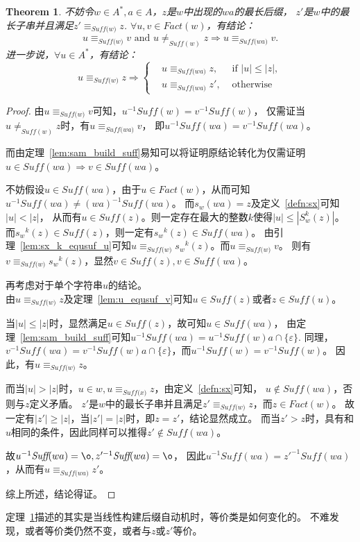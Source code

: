\documentclass[UTF8]{ctexart}
\newtheorem{thm}{Theorem}[subsection]
\theoremstyle{definition}
\theoremstyle{remark}
\numberwithin{equation}{subsection}
\newcommand{\equsuf}[1][x]{\equiv_{\textit{Suff(#1)}}}
\newcommand{\Suff}{\textit{Suff}}
\begin{document}
	\begin{thm}
	\label{thm:sam_ec}
		不妨令$w \in A^*, a \in A$，$z$是$w$中出现的$wa$的最长后缀，
		$z'$是$w$中的最长子串并且满足$z' \equsuf[w] z$.
		$\forall u,v \in Fact(w)$，有结论：
		\[
			u \equsuf[w] v \text{ and } u \neq_{\Suff(w)} z \Longrightarrow u \equsuf[wa] v.
		\]
		进一步说，$\forall u \in A^*$，有结论：
		\[
			u \equsuf[w] z \Longrightarrow
			\left\{
				\begin{aligned}
					&u \equsuf[wa] z,	&\text{ if } |u| \le |z|,	\\
					&u \equsuf[wa] z',	&\text{ otherwise }
				\end{aligned}
			\right .
		\]
	\end{thm}
	\begin{proof}
		由$u \equsuf[w] v$可知，$u^{-1} \Suff(w) = v^{-1} \Suff(w)$，
		仅需证当$u \neq_{\Suff(w)} z$时，有$u \equsuf[wa] v$，
		即$u^{-1} \Suff(wa) = v^{-1} \Suff(wa)$。
		
		而由定理~\ref{lem:sam_build_suff}易知可以将证明原结论转化为仅需证明
		$u \in \Suff(wa) \Longrightarrow v \in \Suff(wa)$。
		
		不妨假设$u \in \Suff(wa)$，由于$u \in Fact(w)$，从而可知$u^{-1} \Suff(wa) \neq (wa)^{-1} \Suff(wa)$。
		而$s_{w}(wa) = z$及定义~\ref{defn:sx}可知$|u| < |z|$，
		从而有$u \in \Suff(z)$。则一定存在最大的整数$k$使得$|u| \le |S_w^k(z)|$。
		而${s_w}^k(z) \in \Suff(z)$，则一定有${s_w}^k(z) \in \Suff(wa)$。
		由引理~\ref{lem:sx_k_equsuf_u}可知$u \equsuf[w] {s_w}^k(z)$。而$u \equsuf[w] v$。
		则有$v \equsuf[w] {s_w}^k(z)$，显然$v \in \Suff(z), v \in \Suff(wa)$。
		
		再考虑对于单个字符串$u$的结论。\\
		由$u \equsuf[w] z$及定理~\ref{lem:u_equsuf_v}可知$u \in \Suff(z)$或者$z \in \Suff(u)$。
		
		当$|u| \le |z|$时，显然满足$u \in \Suff(z)$，故可知$u \in \Suff(wa)$，
		由定理~\ref{lem:sam_build_suff}可知$u^{-1} \Suff(wa) = u^{-1} \Suff(w)a \cap \{ \varepsilon \}$.
		同理，$v^{-1} \Suff(wa) = v^{-1} \Suff(w)a \cap \{ \varepsilon \}$，而$u^{-1} \Suff(w) = v^{-1} \Suff(w)$。
		因此，有$u \equsuf[w] z$。
		
		而当$|u| > |z|$时，$u \in w, u \equsuf z$，由定义~\ref{defn:sx}可知，
		$u \notin \Suff(wa)$，否则与$z$定义矛盾。
		$z'$是$w$中的最长子串并且满足$z' \equsuf[w] z$，而$z \in Fact(w)$。
		故一定有$|z'| \ge |z|$，当$|z'| = |z|$时，即$z = z'$，结论显然成立。
		而当$z' > z$时，具有和$u$相同的条件，因此同样可以推得$z' \notin \Suff(wa)$。
		
		故$u^{-1} \Suff(wa) = {\o}, z'^{-1} \Suff(wa) = {\o}$，
		因此$u^{-1} \Suff(wa) = z'^{-1} \Suff(wa)$，从而有$u \equsuf[wa] z'$。
		
		综上所述，结论得证。
	\end{proof}
	定理~\ref{thm:sam_ec}描述的其实是当线性构建后缀自动机时，等价类是如何变化的。
	不难发现，或者等价类仍然不变，或者与$z$或$z'$等价。
	
\end{document}
